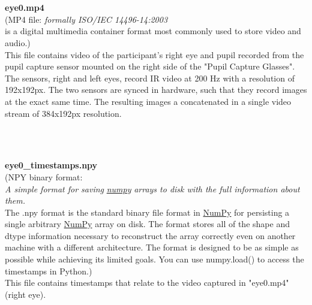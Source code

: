 \begin{description}
\begin{addmargin}[0em]{0em}
    \textbf{\\\\}
    \begin{addmargin}[1em]{0em} %
        \label{eye0.mp4}
        \textbf{eye0.mp4}\\
        (MP4 file: \textit{formally ISO/IEC 14496-14:2003}\\
        is a digital multimedia container format most commonly used to store video and audio.)\\
        This file contains video of the participant's right eye and pupil recorded from the
        pupil capture sensor mounted on the right side of the "Pupil Capture Glasses".
        The sensors, right and left eyes, record IR video at 200 Hz with a resolution of 192x192px.
        The two sensors are synced in hardware, such that they record images at the exact same
        time. The resulting images a concatenated in a single video stream of 384x192px resolution.    
    \end{addmargin} %

    \textbf{\\\\}
    \begin{addmargin}[1em]{0em} %
        \label{eye0_timestamps.npy}
        \textbf{eye0\_timestamps.npy}\\
        (NPY binary format:\\
        \textit{A simple format for saving}
        \href{https://numpy.org/doc/stable/reference/generated/numpy.lib.format.html#module-numpy.lib.format}{\textit{numpy}}
        \textit{arrays to disk with the full information about them.}\\
        The .npy format is the standard binary file format in 
        \href{https://numpy.org/doc/stable/reference/generated/numpy.lib.format.html#module-numpy.lib.format}{NumPy}
        for persisting a single arbitrary
        \href{https://numpy.org/doc/stable/reference/generated/numpy.lib.format.html#module-numpy.lib.format}{NumPy}
        array on disk. The format stores all of the shape and dtype information necessary to
        reconstruct the array correctly even on another machine with a different architecture.
        The format is designed to be as simple as possible while achieving its limited goals.
        You can use numpy.load() to access the timestamps in Python.)\\
        This file contains timestamps that relate to the video captured in "eye0.mp4" (right eye). 
    \end{addmargin} %


\end{addmargin}
\end{description}
